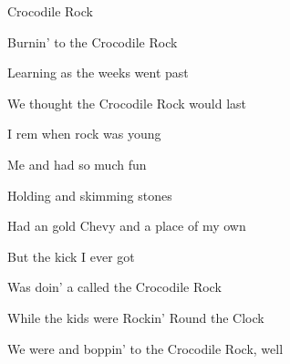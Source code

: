 \begin{SBSong}{Crocodile Rock}
\begin{SBVerse}
    Burnin'  to the Crocodile Rock

    Learning  as the weeks went past

    We  thought the Crocodile Rock would last
  \end{SBVerse}
  \CBPageBrk
  \begin{SBVerse}
    I rem when rock was young

    Me and  had so much fun

    Holding  and skimming stones

    Had an  gold Chevy and a place of my own

    But the  kick I ever got

    Was doin' a  called the Crocodile Rock

    While the  kids were Rockin' Round the Clock

    We were  and boppin' to the Crocodile Rock, well
  \end{SBVerse}
\end{SBSong}